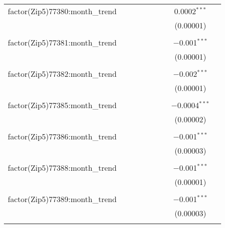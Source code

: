 \begin{table}[H]
{\begin{tabular}{@{\extracolsep{5pt}}lcccccccc}
  factor(Zip5)77380:month\_trend &  &  &  &  &  &  & 0.0002$^{***}$ &  \\  

   &  &  &  &  &  &  & (0.00001) &  \\  

   & & & & & & & & \\  

  factor(Zip5)77381:month\_trend &  &  &  &  &  &  & $-$0.001$^{***}$ &  \\  

   &  &  &  &  &  &  & (0.00001) &  \\  

   & & & & & & & & \\  

  factor(Zip5)77382:month\_trend &  &  &  &  &  &  & $-$0.002$^{***}$ &  \\  

   &  &  &  &  &  &  & (0.00001) &  \\  

   & & & & & & & & \\  

  factor(Zip5)77385:month\_trend &  &  &  &  &  &  & $-$0.0004$^{***}$ &  \\  

   &  &  &  &  &  &  & (0.00002) &  \\  

   & & & & & & & & \\  

  factor(Zip5)77386:month\_trend &  &  &  &  &  &  & $-$0.001$^{***}$ &  \\  

   &  &  &  &  &  &  & (0.00003) &  \\  

   & & & & & & & & \\  

  factor(Zip5)77388:month\_trend &  &  &  &  &  &  & $-$0.001$^{***}$ &  \\  

   &  &  &  &  &  &  & (0.00001) &  \\  

   & & & & & & & & \\  

  factor(Zip5)77389:month\_trend &  &  &  &  &  &  & $-$0.001$^{***}$ &  \\  

   &  &  &  &  &  &  & (0.00003) &  \\  

   & & & & & & & & \\  


\end{tabular}}
\end{table}
